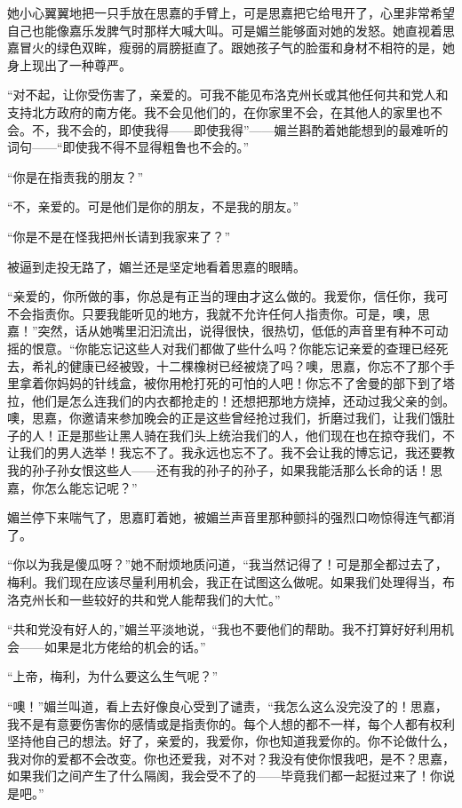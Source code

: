 \par 她小心翼翼地把一只手放在思嘉的手臂上，可是思嘉把它给甩开了，心里非常希望自己也能像嘉乐发脾气时那样大喊大叫。可是媚兰能够面对她的发怒。她直视着思嘉冒火的绿色双眸，瘦弱的肩膀挺直了。跟她孩子气的脸蛋和身材不相符的是，她身上现出了一种尊严。
\par “对不起，让你受伤害了，亲爱的。可我不能见布洛克州长或其他任何共和党人和支持北方政府的南方佬。我不会见他们的，在你家里不会，在其他人的家里也不会。不，我不会的，即使我得——即使我得”——媚兰斟酌着她能想到的最难听的词句——“即使我不得不显得粗鲁也不会的。”
\par “你是在指责我的朋友？”
\par “不，亲爱的。可是他们是你的朋友，不是我的朋友。”
\par “你是不是在怪我把州长请到我家来了？”
\par 被逼到走投无路了，媚兰还是坚定地看着思嘉的眼睛。
\par “亲爱的，你所做的事，你总是有正当的理由才这么做的。我爱你，信任你，我可不会指责你。只要我能听见的地方，我就不允许任何人指责你。可是，噢，思嘉！”突然，话从她嘴里汩汩流出，说得很快，很热切，低低的声音里有种不可动摇的恨意。“你能忘记这些人对我们都做了些什么吗？你能忘记亲爱的查理已经死去，希礼的健康已经被毁，十二棵橡树已经被烧了吗？噢，思嘉，你忘不了那个手里拿着你妈妈的针线盒，被你用枪打死的可怕的人吧！你忘不了舍曼的部下到了塔拉，他们是怎么连我们的内衣都抢走的！还想把那地方烧掉，还动过我父亲的剑。噢，思嘉，你邀请来参加晚会的正是这些曾经抢过我们，折磨过我们，让我们饿肚子的人！正是那些让黑人骑在我们头上统治我们的人，他们现在也在掠夺我们，不让我们的男人选举！我忘不了。我永远也忘不了。我不会让我的博忘记，我还要教我的孙子孙女恨这些人——还有我的孙子的孙子，如果我能活那么长命的话！思嘉，你怎么能忘记呢？”
\par 媚兰停下来喘气了，思嘉盯着她，被媚兰声音里那种颤抖的强烈口吻惊得连气都消了。
\par “你以为我是傻瓜呀？”她不耐烦地质问道，“我当然记得了！可是那全都过去了，梅利。我们现在应该尽量利用机会，我正在试图这么做呢。如果我们处理得当，布洛克州长和一些较好的共和党人能帮我们的大忙。”
\par “共和党没有好人的，”媚兰平淡地说，“我也不要他们的帮助。我不打算好好利用机会——如果是北方佬给的机会的话。”
\par “上帝，梅利，为什么要这么生气呢？”
\par “噢！”媚兰叫道，看上去好像良心受到了谴责，“我怎么这么没完没了的！思嘉，我不是有意要伤害你的感情或是指责你的。每个人想的都不一样，每个人都有权利坚持他自己的想法。好了，亲爱的，我爱你，你也知道我爱你的。你不论做什么，我对你的爱都不会改变。你也还爱我，对不对？我没有使你恨我吧，是不？思嘉，如果我们之间产生了什么隔阂，我会受不了的——毕竟我们都一起挺过来了！你说是吧。”
